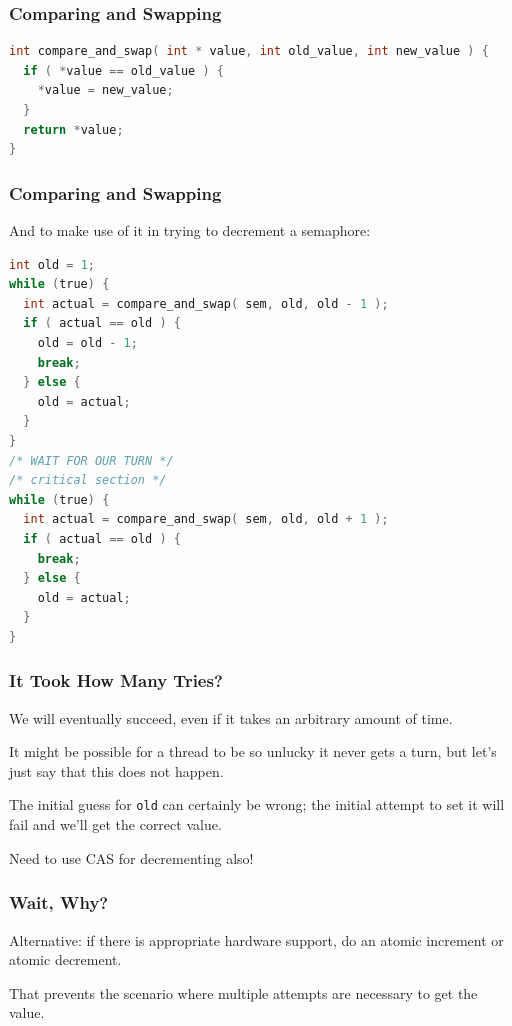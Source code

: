 \begin{frame}[fragile]
\frametitle{Comparing and Swapping}

\begin{lstlisting}[language=C]
int compare_and_swap( int * value, int old_value, int new_value ) {
  if ( *value == old_value ) {
    *value = new_value;
  }
  return *value;
}
\end{lstlisting}

\end{frame}

\begin{frame}[fragile]
\frametitle{Comparing and Swapping}

And to make use of it in trying to decrement a semaphore:

\begin{lstlisting}[language=C]
int old = 1;
while (true) {
  int actual = compare_and_swap( sem, old, old - 1 );
  if ( actual == old ) {
    old = old - 1;
    break;
  } else {
    old = actual;
  }
}
/* WAIT FOR OUR TURN */
/* critical section */
while (true) {
  int actual = compare_and_swap( sem, old, old + 1 );
  if ( actual == old ) {
    break;
  } else {
    old = actual;
  }
}
\end{lstlisting}

\end{frame}

\begin{frame}
\frametitle{It Took How Many Tries?}

We will eventually succeed, even if it takes an arbitrary amount of time.

 It might be possible for a thread to be so unlucky it never gets a turn, but let's just say that this does not happen.

The initial guess for \texttt{old} can certainly be wrong; the initial attempt to set it will fail and we'll get the correct value.

Need to use CAS for decrementing also!

\end{frame}

\begin{frame}
\frametitle{Wait, Why?}

Alternative: if there is appropriate hardware support, do an atomic increment or atomic decrement.

That prevents the scenario where multiple attempts are necessary to get the value. 

\end{frame}

